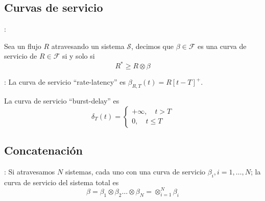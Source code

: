 \documentclass[xcolor={x11names}]{beamer}
\begin{document}
\subsection{Curvas de servicio}
\begin{frame}{\secname: \subsecname}
    \begin{definition}
        Sea un flujo $R$ atravesando
        un sistema $\mathcal{S}$,
        decimos que $\beta\in\mathcal{F}$
        es una curva de servicio
        de $R\in\mathcal{F}$ si y solo si
        \begin{equation*}
            R^*\geq R\otimes\beta
        \end{equation*}
    \end{definition}

    \vfill

    \begin{figure}[h]
        \centering
        
    \end{figure}
\end{frame}



\begin{frame}{\secname: \subsecname}
    La curva de servicio ``rate-latency''
    es $\beta_{R,T}(t)=R[t-T]^+$.

    \vfill

    La curva de servicio
    ``burst-delay'' es
    \begin{equation*}
        \delta_T(t)=\begin{cases}
            +\infty,\quad t>T\\
            0, \quad t\leq T
        \end{cases}
    \end{equation*}

    \vfill
    
    \begin{figure}[h]
        \centering
        
    \end{figure}
\end{frame}


\subsection{Concatenación}
\begin{frame}{\secname: \subsecname}
    Si atravesamos $N$ sistemas, cada
    uno con una curva de servicio
    $\beta_i,i=1,\ldots,N$; la curva
    de servicio del sistema total
    es
    \begin{equation*}
        \beta
        =\beta_1\otimes\beta_2
        \ldots\otimes\beta_N
        =\otimes_{i=1}^N\beta_i
    \end{equation*}

    \vfill

    \begin{figure}[h]
        \centering
        
    \end{figure}
\end{frame}
\end{document}
